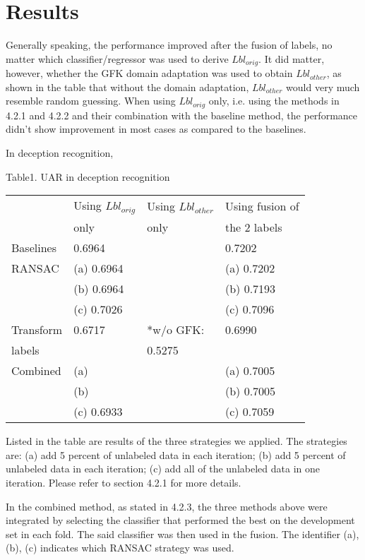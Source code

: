 \documentclass{article}
\begin{document}
\section{Results}
Generally speaking, the performance improved after the fusion of labels, no matter which classifier/regressor was used to derive $Lbl_{orig}$. It did matter, however, whether the GFK domain adaptation was used to obtain $Lbl_{other}$, as shown in the table that without the domain adaptation, $Lbl_{other}$ would very much resemble random guessing. When using $Lbl_{orig}$ only, i.e. using the methods in 4.2.1 and 4.2.2 and their combination with the baseline method, the performance didn't show improvement in most cases as compared to the baselines.\par
In deception recognition, \par
\centerline{Table1. UAR in deception recognition}
\begin{threeparttable}
\begin{tabular}{|l|l|l|l|}
\hline
& Using $Lbl_{orig}$ & Using $Lbl_{other}$ & Using fusion of\\
& only & only & the 2 labels\\
\hline
Baselines & 0.6964 & \multirow{4}{*}{ } & 0.7202 \\
\cline{1-2}
\cline{4-4}
RANSAC & (a) 0.6964\tnote{1} & 0.6081 & (a) 0.7202 \\
& (b) 0.6964 & & (b) 0.7193 \\
& (c) 0.7026 & & (c) 0.7096 \\
\cline{1-2}
\cline{4-4}
Transform & 0.6717 & *w/o GFK: & 0.6990 \\
labels & & 0.5275 & \\
\cline{1-2}
\cline{4-4}
Combined\tnote{2} & (a)  & & (a) 0.7005 \\
& (b)  & & (b) 0.7005\\
& (c) 0.6933 & & (c) 0.7059\\
\hline
\end{tabular}
\begin{tablenotes}
\item[1] Listed in the table are results of the three strategies we applied. The strategies are: (a) add 5 percent of unlabeled data in each iteration; (b) add 5 percent of unlabeled data in each iteration; (c) add all of the unlabeled data in one iteration. Please refer to section 4.2.1 for more details.
\item[2] In the combined method, as stated in 4.2.3, the three methods above were integrated by selecting the classifier that performed the best on the development set in each fold. The said classifier was then used in the fusion. The identifier (a), (b), (c) indicates which RANSAC strategy was used.
\end{tablenotes}
\end{threeparttable}
\end{document}
